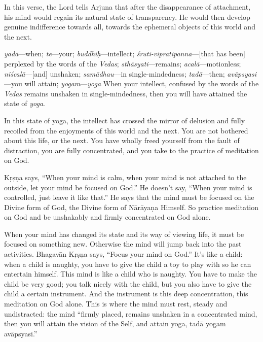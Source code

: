 In this verse, the Lord tells Arjuna that after the disappearance of attachment, his mind would regain its natural state of transparency. He would then develop genuine indifference towards all, towards the ephemeral objects of this world and the next.

{%
  \textit{yadā}---when; 
  \textit{te}---your; 
  \textit{buddhiḥ}---intellect; 
  \textit{śruti-vipratipannā}---[that has been] perplexed by the words of the \textit{Vedas}; 
  \textit{sthāsyati}---remains; 
  \textit{acalā}---motionless; 
  \textit{niścalā}---[and] unshaken; 
  \textit{samādhau}---in single-mindedness; 
  \textit{tadā}---then; 
  \textit{avāpsyasi}---you will attain; 
  \textit{yogam}---\textit{yoga}
}
{%
  When your intellect, confused by the words of the \textit{Vedas} remains unshaken in single-mindedness, then you will have attained the state of \textit{yoga}.
}

In this state of yoga, the intellect has crossed the mirror of delusion and fully recoiled from the enjoyments of this world and the next. You are not bothered about this life, or the next. You have wholly freed yourself from the fault of distraction, you are fully concentrated, and you take to the practice of meditation on God.

Kṛṣṇa says, “When your mind is calm, when your mind is not attached to the outside, let your mind be focused on God.” He doesn’t say, “When your mind is controlled, just leave it like that.” He says that the mind must be focused on the Divine form of God, the Divine form of Nārāyaṇa Himself. So practice meditation on God and be unshakably and firmly concentrated on God alone.

When your mind has changed its state and its way of viewing life, it must be focused on something new. Otherwise the mind will jump back into the past activities. Bhagavān Kṛṣṇa says, “Focus your mind on God.” It’s like a child: when a child is naughty, you have to give the child a toy to play with so he can entertain himself. This mind is like a child who is naughty. You have to make the child be very good; you talk nicely with the child, but you also have to give the child a certain instrument. And the instrument is this deep concentration, this meditation on God alone. This is where the mind must rest, steady and undistracted: the mind “firmly placed, remains unshaken in a concentrated mind, then you will attain the vision of the Self, and attain yoga, tadā yogam avāpsyasi.”

